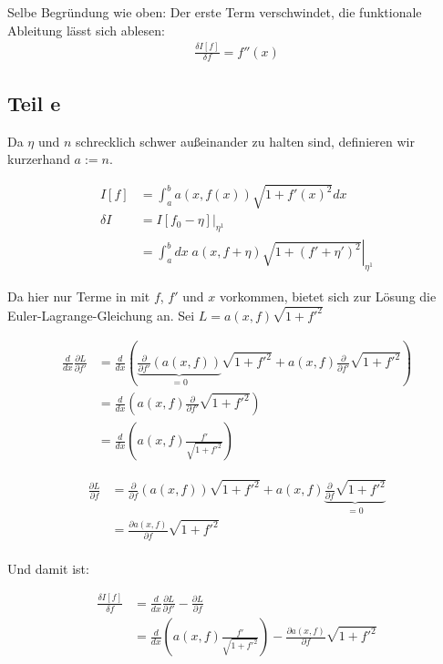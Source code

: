 \documentclass[a4paper,german,12pt,smallheadings]{scrartcl}
\begin{document}
Selbe Begründung wie oben: Der erste Term verschwindet, die funktionale Ableitung lässt sich ablesen:
\begin{align*}
  \frac{\delta I[f]}{\delta f} = f''(x)
\end{align*}

\subsection*{Teil e}
Da $\eta$ und $n$ schrecklich schwer außeinander zu halten sind,
definieren wir kurzerhand $a := n$.

\begin{align*}
  I[f] &= \int_a^b a(x,f(x)) \sqrt{1+f'(x)^2} dx \\
  \delta I &= \left.I[f_0 - \eta]\right|_{\eta^1} \\
  &=\left.\int_a^b dx \; a(x, f + \eta) \sqrt{1+(f'+\eta')^2} \right|_{\eta^1}
\end{align*}

Da hier nur Terme in mit $f$, $f'$ und $x$ vorkommen, bietet sich zur Lösung
die Euler-Lagrange-Gleichung an. Sei $L = a(x, f) \sqrt{1+f'^2}$

\begin{align*}
  \frac{d}{dx} \frac{\partial L}{\partial f'} &= \frac{d}{dx} \left(\underbrace{\frac{\partial}{\partial f'} (a(x, f))}_{=0} \sqrt{1+f'^2} + a(x,f) \frac{\partial}{\partial f'} \sqrt{1+f'^2} \right) \\
  &= \frac{d}{dx} \left(a(x,f) \frac{\partial}{\partial f'} \sqrt{1+f'^2} \right) \\
  &= \frac{d}{dx} \left(a(x,f) \frac{f'}{\sqrt{1+f'^2}} \right)
\end{align*}

\begin{align*}
  \frac{\partial L}{\partial f} &= \frac{\partial}{\partial f} \left(a(x, f)\right) \sqrt{1+f'^2} + a(x, f) \underbrace{\frac{\partial}{\partial f} \sqrt{1+f'^2}}_{=0} \\
  &= \frac{\partial a(x,f)}{\partial f} \sqrt{1+f'^2} \\
\end{align*}

Und damit ist:

\begin{align*}
  \frac{\delta I[f]}{\delta f} &= \frac{d}{dx} \frac{\partial L}{\partial f'} - \frac{\partial L}{\partial f} \\
  &= \frac{d}{dx} \left(a(x,f) \frac{f'}{\sqrt{1+f'^2}} \right) - \frac{\partial a(x,f)}{\partial f} \sqrt{1+f'^2}
\end{align*}
\end{document}
